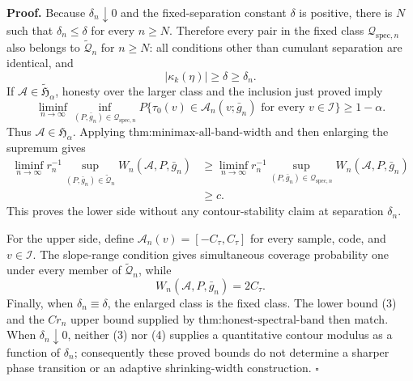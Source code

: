 \textbf{Proof.}
Because \(\delta_n\downarrow0\) and the fixed-separation constant \(\delta\) is positive, there is \(N\) such that \(\delta_n\le\delta\) for every \(n\ge N\).  Therefore every pair in the fixed class \(\mathcal Q_{\mathrm{spec},n}\) also belongs to \(\widetilde{\mathcal Q}_n\) for \(n\ge N\): all conditions other than cumulant separation are identical, and
\[
 |\kappa_k(\eta)|\ge\delta\ge\delta_n. \tag{1}
\]
If \(\mathcal A\in\widetilde{\mathfrak H}_\alpha\), honesty over the larger class and the inclusion just proved imply
\[
 \liminf_{n\to\infty}\inf_{(P,\bar g_n)\in\mathcal Q_{\mathrm{spec},n}}
 P\{\tau_0(v)\in\mathcal A_n(v;\bar g_n)\text{ for every }v\in\mathcal I\}
 \ge1-\alpha. \tag{2}
\]
Thus \(\mathcal A\in\mathfrak H_\alpha\).  Applying \(\text{thm:minimax-all-band-width}\) and then enlarging the supremum gives
\[
 \begin{aligned}
 \liminf_{n\to\infty}r_n^{-1}
 \sup_{(P,\bar g_n)\in\widetilde{\mathcal Q}_n}W_n(\mathcal A,P,\bar g_n)
 &\ge
 \liminf_{n\to\infty}r_n^{-1}
 \sup_{(P,\bar g_n)\in\mathcal Q_{\mathrm{spec},n}}W_n(\mathcal A,P,\bar g_n)\\
 &\ge c. \tag{3}
 \end{aligned}
\]
This proves the lower side without any contour-stability claim at separation \(\delta_n\).

For the upper side, define \(\mathcal A_n(v)=[-C_\tau,C_\tau]\) for every sample, code, and \(v\in\mathcal I\).  The slope-range condition gives simultaneous coverage probability one under every member of \(\widetilde{\mathcal Q}_n\), while
\[
 W_n(\mathcal A,P,\bar g_n)=2C_\tau. \tag{4}
\]
Finally, when \(\delta_n\equiv\delta\), the enlarged class is the fixed class.  The lower bound (3) and the \(Cr_n\) upper bound supplied by \(\text{thm:honest-spectral-band}\) then match.  When \(\delta_n\downarrow0\), neither (3) nor (4) supplies a quantitative contour modulus as a function of \(\delta_n\); consequently these proved bounds do not determine a sharper phase transition or an adaptive shrinking-width construction. \(\square\)